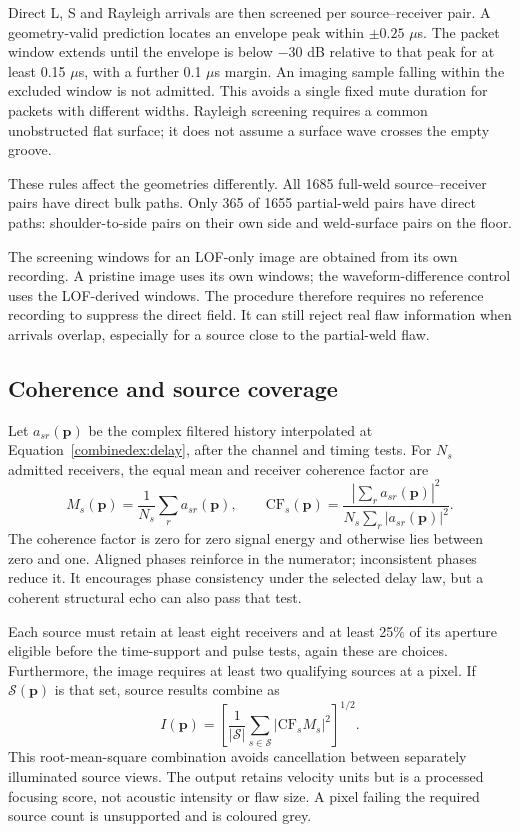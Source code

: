 Direct L, S and Rayleigh arrivals are then screened per source--receiver pair. A geometry-valid prediction locates an envelope peak within $\pm0.25$ $\mu$s. The packet window extends until the envelope is below $-30$ dB relative to that peak for at least 0.15 $\mu$s, with a further 0.1 $\mu$s margin. An imaging sample falling within the excluded window is not admitted. This avoids a single fixed mute duration for packets with different widths. Rayleigh screening requires a common unobstructed flat surface; it does not assume a surface wave crosses the empty groove.

These rules affect the geometries differently. All 1685 full-weld source--receiver pairs have direct bulk paths. Only 365 of 1655 partial-weld pairs have direct paths: shoulder-to-side pairs on their own side and weld-surface pairs on the floor. 

The screening windows for an LOF-only image are obtained from its own recording. A pristine image uses its own windows; the waveform-difference control uses the LOF-derived windows. The procedure therefore requires no reference recording to suppress the direct field. It can still reject real flaw information when arrivals overlap, especially for a source close to the partial-weld flaw. 

\subsection{Coherence and source coverage}
Let $a_{sr}(\mathbf p)$ be the complex filtered history interpolated at Equation~\ref{combinedex:delay}, after the channel and timing tests. For $N_s$ admitted receivers, the equal mean and receiver coherence factor are
\begin{equation}
 M_s(\mathbf p)=\frac{1}{N_s}\sum_r a_{sr}(\mathbf p),\qquad
 \mathrm{CF}_s(\mathbf p)=\frac{|\sum_r a_{sr}(\mathbf p)|^2}
 {N_s\sum_r|a_{sr}(\mathbf p)|^2}.
\label{combinedex:cf}
\end{equation}
The coherence factor is zero for zero signal energy and otherwise lies between zero and one. Aligned phases reinforce in the numerator; inconsistent phases reduce it. It encourages phase consistency under the selected delay law, but a coherent structural echo can also pass that test. 

Each source must retain at least eight receivers and at least 25\% of its aperture eligible before the time-support and pulse tests, again these are choices. Furthermore, the image requires at least two qualifying sources at a pixel. If $\mathcal S(\mathbf p)$ is that set, source results combine as
\begin{equation}
 I(\mathbf p)=\left[\frac{1}{|\mathcal S|}\sum_{s\in\mathcal S}
                 |\mathrm{CF}_s M_s|^2\right]^{1/2}.
\label{combinedex:source_rms}
\end{equation}
This root-mean-square combination avoids cancellation between separately illuminated source views. The output retains velocity units but is a processed focusing score, not acoustic intensity or flaw size. A pixel failing the required source count is unsupported and is coloured grey.


